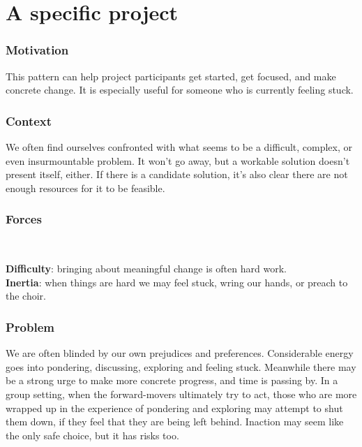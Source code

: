 \section{A specific project}\label{sec:A specific project}
\subsubsection*{Motivation} This pattern can help project participants get started, get focused, and make concrete change.  It is especially useful for someone who is currently feeling stuck.

\subsubsection*{Context}
We often find ourselves confronted with what seems to be a difficult, complex, or even insurmountable problem.  It won't go away, but a workable solution doesn't present itself, either.  If there is a candidate solution, it's also clear there are not enough resources for it to be feasible.

\subsubsection*{Forces}~
\parbox[t]{.85\textwidth}{
\textbf{Difficulty}: bringing about meaningful change is often hard work.\\
\textbf{Inertia}: when things are hard we may feel stuck, wring our hands, or preach to the choir.
}

\subsubsection*{Problem}
We are often blinded by our own prejudices and preferences. Considerable energy goes into pondering, discussing, exploring and feeling stuck.  Meanwhile there may be a strong urge to make more concrete progress, and time is passing by. In a group setting, when the forward-movers ultimately try to act, those who are more wrapped up in the experience of pondering and exploring may attempt to shut them down, if they feel that they are being left behind.  Inaction may seem like the only safe choice, but it has risks too.

